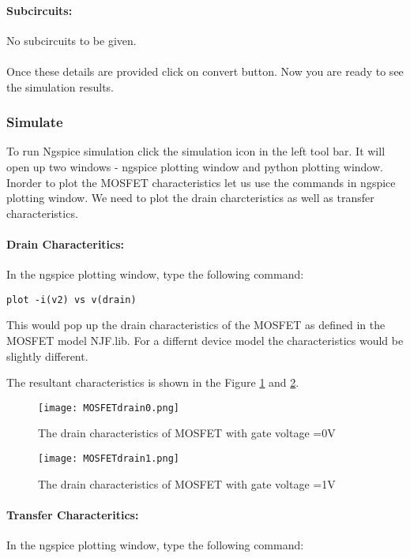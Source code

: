 \paragraph{Subcircuits:} No subcircuits to be given.

\paragraph{}
 Once these details are provided click on convert button. %
Now you are ready to see the simulation results.

\subsubsection{Simulate} To run Ngspice simulation click the simulation icon in the left tool bar. It will open up two windows - ngspice plotting window and python plotting window. Inorder to plot the MOSFET characteristics let us use the commands in ngspice plotting window. We need to plot the drain charcteristics as well as transfer characteristics.

\paragraph{Drain Characteritics:} In the ngspice plotting window, type the following command:

\texttt{plot -i(v2) vs v(drain)}

This would pop up the drain characteristics of the MOSFET as defined in the MOSFET model NJF.lib. For a differnt device model the characteristics would be slightly different.

The resultant characteristics is shown in the Figure \ref{MOSFETdrain0} and \ref{MOSFETdrain1}.
\begin{figure}[h]
\centering
\texttt{[image: MOSFETdrain0.png]}
\caption{The drain characteristics of MOSFET with gate voltage =0V }
\label{MOSFETdrain0}
\end{figure}
\begin{figure}[h]
\centering
\texttt{[image: MOSFETdrain1.png]}
\caption{The drain characteristics of MOSFET with gate voltage =1V }
\label{MOSFETdrain1}
\end{figure}

\paragraph{Transfer Characteritics:} In the ngspice plotting window, type the following command:

